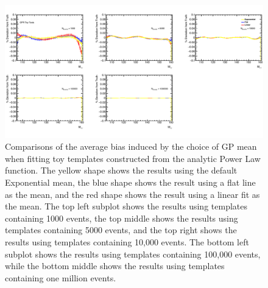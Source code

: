 \begin{figure} 
\begin{center}
  \includegraphics[width=\textwidth]{figures/background/gpr/checkBiasFromPriorChoice/Plots_GPR_PriorBiases_PowerLaw_crop}   
  \caption{Comparisons of the average bias induced by the choice of GP mean when fitting toy templates constructed from the analytic Power Law function. The yellow shape shows the results using the default Exponential mean, the blue shape shows the result using a flat line as the mean, and the red shape shows the result using a linear fit as the mean. The top left subplot shows the results using templates containing 1000 events, the top middle shows the results using templates containing 5000 events, and the top right shows the results using templates containing 10,000 events. The bottom left subplot shows the results using templates containing 100,000 events, while the bottom middle shows the results using templates containing one million events.}
\label{fig:prior_bias_powerlaw}
\end{center}
\end{figure}

